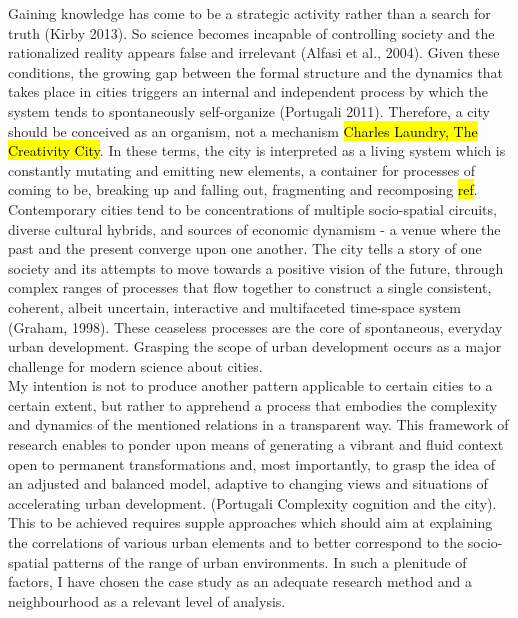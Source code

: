 \documentclass[11pt]{report}
\begin{document}
Gaining knowledge has come to be a strategic activity rather than a search for truth (Kirby 2013). So science becomes incapable of controlling society and the rationalized reality appears false and irrelevant (Alfasi et al., 2004). Given these conditions, the growing gap between the formal structure and the dynamics that takes place in cities triggers an internal and independent process by which the system tends to spontaneously self-organize (Portugali 2011). Therefore, a city should be conceived as an organism, not a mechanism \hl{Charles Laundry, The Creativity City}. In these terms, the city is interpreted as a living system which is constantly mutating and emitting new elements, a container for processes of coming to be, breaking up and falling out, fragmenting and recomposing \hl{ref}. Contemporary cities tend to be concentrations of multiple socio-spatial circuits, diverse cultural hybrids, and sources of economic dynamism - a venue where the past and the present converge upon one another. The city tells a story of one society and its attempts to move towards a positive vision of the future, through complex ranges of processes that flow together to construct a single consistent, coherent, albeit uncertain, interactive and multifaceted time-space system (Graham, 1998). These ceaseless processes are the core of spontaneous, everyday urban development. Grasping the scope of urban development occurs as a major challenge for modern science about cities.
\\
My intention is not to produce another pattern applicable to certain cities to a certain extent, but rather to apprehend a process that embodies the complexity and dynamics of the mentioned relations in a transparent way.  This framework of research enables to ponder upon means of generating a vibrant and fluid context open to permanent transformations and, most importantly, to grasp the idea of an adjusted and balanced model, adaptive to changing views and situations of accelerating urban development. (Portugali Complexity cognition and the city). This to be achieved requires supple approaches which should aim at explaining the correlations of various urban elements and to better correspond to the socio-spatial patterns of the range of urban environments. In such a plenitude of factors, I have chosen the case study as an adequate research method and a neighbourhood as a relevant level of analysis.
\\
\end{document}
